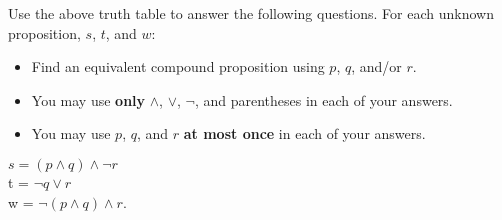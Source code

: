 \documentclass[12pt]{exam}
\begin{document}
Use the above truth table to answer the following questions. For each unknown proposition, $s$, $t$, and $w$: 
\begin{itemize}
    \item Find an equivalent compound proposition using $p$, $q$, and/or $r$. 
    \item You may use \textbf{only} $\land$, $\lor$, $\neg$, and parentheses in each of your answers.  
    \item You may use $p$, $q$, and $r$ \textbf{at most once} in each of your answers.
\end{itemize}

\begin{solution}
$s = (p \land q) \land \neg r$\\ t = $\neg q \lor r$\\ w = $\neg (p \land q) \land r$.
\end{solution}

\end{document}
